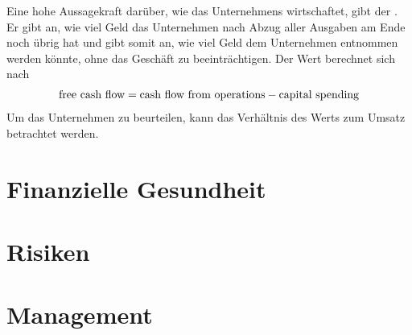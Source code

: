 Eine hohe Aussagekraft darüber, wie das Unternehmens wirtschaftet, gibt der \textbf{\freeCashFlow}.
Er gibt an, wie viel Geld das Unternehmen nach Abzug aller Ausgaben am Ende noch übrig hat und gibt somit an, wie viel Geld dem Unternehmen entnommen werden könnte, ohne das Geschäft zu beeinträchtigen.
Der Wert berechnet sich nach
\begin{align}
    \text{free cash flow} = \text{cash flow from operations} - \text{capital spending}
\end{align}
Um das Unternehmen zu beurteilen, kann das Verhältnis des Werts zum Umsatz betrachtet werden.




\section{Finanzielle Gesundheit}
\section{Risiken}
\section{Management}
